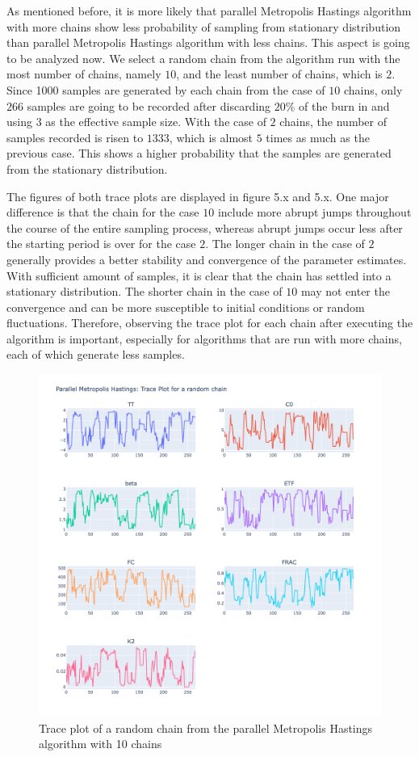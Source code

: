 As mentioned before, it is more likely that parallel Metropolis Hastings algorithm with more chains show less probability of sampling from stationary distribution than parallel Metropolis Hastings algorithm with less chains. This aspect is going to be analyzed now. We select a random chain from the algorithm run with the most number of chains, namely $10$, and the least number of chains, which is $2$. Since 1000 samples are generated by each chain from the case of $10$ chains, only $266$ samples are going to be recorded after discarding $20\%$ of the burn in and using $3$ as the effective sample size. With the case of $2$ chains, the number of samples recorded is risen to $1333$, which is almost $5$ times as much as the previous case. This shows a higher probability that the samples are generated from the stationary distribution.

The figures of both trace plots are displayed in figure 5.x and 5.x. One major difference is that the chain for the case $10$ include more abrupt jumps throughout the course of the entire sampling process, whereas abrupt jumps occur less after the starting period is over for the case $2$. The longer chain in the case of $2$ generally provides a better stability and convergence of the parameter estimates. With sufficient amount of samples, it is clear that the chain has settled into a stationary distribution. The shorter chain in the case of $10$ may not enter the convergence and can be more susceptible to initial conditions or random fluctuations. Therefore, observing the trace plot for each chain after executing the algorithm is important, especially for algorithms that are run with more chains, each of which generate less samples.

\begin{figure}[H]
    \centering
    \includegraphics[width=1\textwidth]{figures/parallel_mh/tp_rand_10.png}
    \captionsetup{width=.8\textwidth}
    \caption{Trace plot of a random chain from the parallel Metropolis Hastings algorithm with 10 chains}
    \label{fig:enter-label}
\end{figure}

